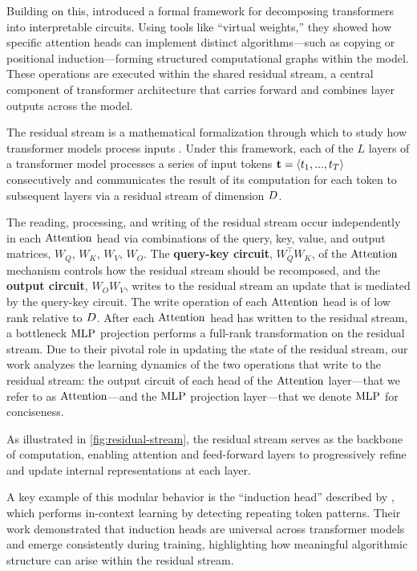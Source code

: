 Building on this, \citet{elhage2021mathematical} introduced a formal framework for decomposing transformers into interpretable circuits. Using tools like “virtual weights,” they showed how specific attention heads can implement distinct algorithms—such as copying or positional induction—forming structured computational graphs within the model. These operations are executed within the shared residual stream, a central component of transformer architecture that carries forward and combines layer outputs across the model.

The residual stream is a mathematical formalization through which to study how transformer models process inputs \citep{elhage2021mathematical}. Under this framework, each of the $L$ layers of a transformer model processes a series of input tokens $\boldsymbol{\mathrm{t}} = \langle t_1, ..., t_T\rangle$ consecutively and communicates the result of its computation for each token to subsequent layers via a residual stream of dimension $D$. 

The reading, processing, and writing of the residual stream occur independently in each $\mathrm{Attention}$ head via combinations of the query, key, value, and output matrices, $W_Q$, $W_K$, $W_V$, $W_O$. The \textbf{query-key circuit}, $W_Q^{\top}W_K$, of the $\mathrm{Attention}$ mechanism controls how the residual stream should be recomposed, and the \textbf{output circuit}, $W_OW_V$, writes to the residual stream an update that is mediated by the query-key circuit. The write operation of each $\mathrm{Attention}$ head is of low rank relative to $D$. After each $\mathrm{Attention}$ head has written to the residual stream, a bottleneck $\mathrm{MLP}$ projection performs a full-rank transformation on the residual stream. Due to their pivotal role in updating the state of the residual stream, our work analyzes the learning dynamics of the two operations that write to the residual stream: the output circuit of each head of the $\mathrm{Attention}$ layer---that we refer to as $\mathrm{Attention}$---and the $\mathrm{MLP}$ projection layer---that we denote $\mathrm{MLP}$ for conciseness.

As illustrated in \cref{fig:residual-stream}, the residual stream serves as the backbone of computation, enabling attention and feed-forward layers to progressively refine and update internal representations at each layer.

A key example of this modular behavior is the “induction head” described by \citet{olsson2022inductionheads}, which performs in-context learning by detecting repeating token patterns. Their work demonstrated that induction heads are universal across transformer models and emerge consistently during training, highlighting how meaningful algorithmic structure can arise within the residual stream.

